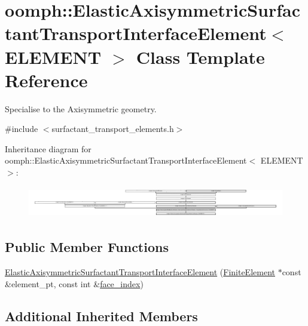 \hypertarget{classoomph_1_1ElasticAxisymmetricSurfactantTransportInterfaceElement}{}\section{oomph\+:\+:Elastic\+Axisymmetric\+Surfactant\+Transport\+Interface\+Element$<$ E\+L\+E\+M\+E\+NT $>$ Class Template Reference}
\label{classoomph_1_1ElasticAxisymmetricSurfactantTransportInterfaceElement}


Specialise to the Axisymmetric geometry.  




{\ttfamily \#include $<$surfactant\+\_\+transport\+\_\+elements.\+h$>$}

Inheritance diagram for oomph\+:\+:Elastic\+Axisymmetric\+Surfactant\+Transport\+Interface\+Element$<$ E\+L\+E\+M\+E\+NT $>$\+:\begin{figure}[H]
\begin{center}
\leavevmode
\includegraphics[height=1.390071cm]{classoomph_1_1ElasticAxisymmetricSurfactantTransportInterfaceElement}
\end{center}
\end{figure}
\subsection*{Public Member Functions}
\begin{DoxyCompactItemize}
\item 
\hyperlink{classoomph_1_1ElasticAxisymmetricSurfactantTransportInterfaceElement_a7e0f4dbf25bf0556a2675e599eeb6365}{Elastic\+Axisymmetric\+Surfactant\+Transport\+Interface\+Element} (\hyperlink{classoomph_1_1FiniteElement}{Finite\+Element} $\ast$const \&element\+\_\+pt, const int \&\hyperlink{classoomph_1_1FaceElement_a478d577ac6db67ecc80f1f02ae3ab170}{face\+\_\+index})
\end{DoxyCompactItemize}
\subsection*{Additional Inherited Members}



